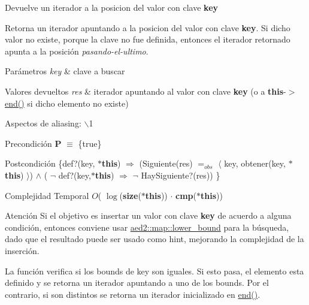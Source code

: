 \-Devuelve un iterador a la posicion del valor con clave {\bfseries key} 

\-Retorna un iterador apuntando a la posicion del valor con clave {\bfseries key}. \-Si dicho valor no existe, porque la clave no fue definida, entonces el iterador retornado apunta a la posición {\itshape pasando-\/el-\/ultimo\/}.


\begin{DoxyParams}{\-Parámetros}
{\em key} & clave a buscar \\
\hline
\end{DoxyParams}

\begin{DoxyRetVals}{\-Valores devueltos}
{\em res} & iterador apuntando al valor con clave {\bfseries key} (o a {\bfseries this}-\/$>$\hyperlink{classaed2_1_1map_a76023e6a56cb625513e1b5ea028bf983_a76023e6a56cb625513e1b5ea028bf983}{end()} si dicho elemento no existe)\\
\hline
\end{DoxyRetVals}
\begin{DoxyParagraph}{\-Aspectos de aliasing\-:}
$\backslash$1
\end{DoxyParagraph}
\begin{DoxyPrecond}{\-Precondición}
{\bfseries \-P} $\equiv$ \{true\} 
\end{DoxyPrecond}
\begin{DoxyPostcond}{\-Postcondición}
\{def?(key, {\bfseries $\ast$this}) $\Rightarrow$ (\-Siguiente(res) $=_{obs}$ $\langle$ key, obtener(key, {\bfseries $\ast$this}) $\rangle$) $\land$ ( $\lnot$ def?(key,{\bfseries $\ast$this}) $\Rightarrow$ $\lnot$ \-Hay\-Siguiente?(res)) \}
\end{DoxyPostcond}

\begin{DoxyDescription}
\item[\-Complejidad \-Temporal]$O$( $\log$({\bfseries size}({\bfseries $\ast$this})) $\cdot$ {\bfseries cmp}({\bfseries $\ast$this}))
\end{DoxyDescription}

\begin{DoxyAttention}{\-Atención}
\-Si el objetivo es insertar un valor con clave {\bfseries key} de acuerdo a alguna condición, entonces conviene usar \hyperlink{classaed2_1_1map_a3399d36fdd5a880b494f3a5795d3f18f_a3399d36fdd5a880b494f3a5795d3f18f}{aed2\-::map\-::lower\-\_\-bound} para la búsqueda, dado que el resultado puede ser usado como hint, mejorando la complejidad de la inserción.
\end{DoxyAttention}
\-La función verifica si los bounds de key son iguales. \-Si esto pasa, el elemento esta definido y se retorna un iterador apuntando a uno de los bounds. \-Por el contrario, si son distintos se retorna un iterador inicializado en \hyperlink{classaed2_1_1map_a76023e6a56cb625513e1b5ea028bf983_a76023e6a56cb625513e1b5ea028bf983}{end()}. 

